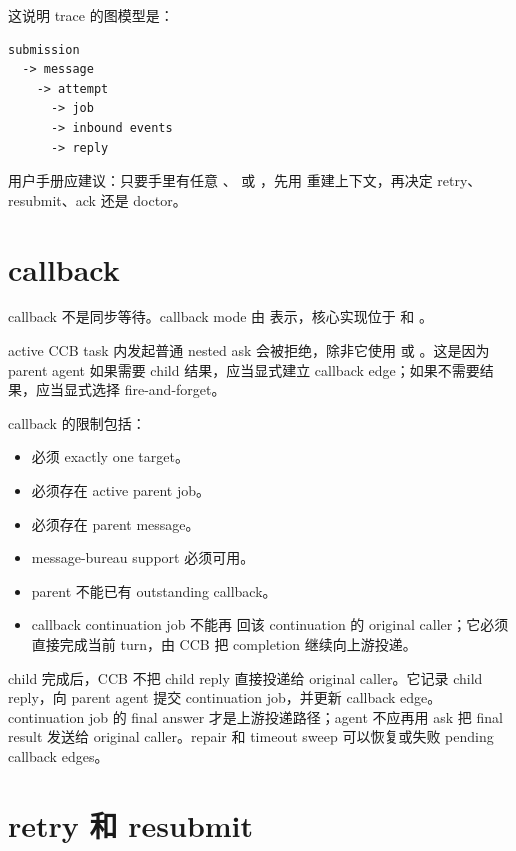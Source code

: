 这说明 trace 的图模型是：

\begin{Verbatim}[fontsize=\small,frame=single]
submission
  -> message
    -> attempt
      -> job
      -> inbound events
      -> reply
\end{Verbatim}

用户手册应建议：只要手里有任意 、 或 ，先用  重建上下文，再决定 retry、resubmit、ack 还是 doctor。

\section{callback}

callback 不是同步等待。callback mode 由  表示，核心实现位于  和 。

active CCB task 内发起普通 nested ask 会被拒绝，除非它使用  或 。这是因为 parent agent 如果需要 child 结果，应当显式建立 callback edge；如果不需要结果，应当显式选择 fire-and-forget。

callback 的限制包括：

\begin{itemize}
  \item 必须 exactly one target。
  \item 必须存在 active parent job。
  \item 必须存在 parent message。
  \item message-bureau support 必须可用。
  \item parent 不能已有 outstanding callback。
  \item callback continuation job 不能再  回该 continuation 的 original caller；它必须直接完成当前 turn，由 CCB 把 completion 继续向上游投递。
\end{itemize}

child 完成后，CCB 不把 child reply 直接投递给 original caller。它记录 child reply，向 parent agent 提交 continuation job，并更新 callback edge。continuation job 的 final answer 才是上游投递路径；agent 不应再用 ask 把 final result 发送给 original caller。repair 和 timeout sweep 可以恢复或失败 pending callback edges。

\section{retry 和 resubmit}

